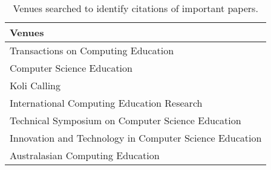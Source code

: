 \begin{table*}[t]
\begin{tabular}{l}
Venues\\\hline
Transactions on Computing Education\\
Computer Science Education\\
Koli Calling\\
International Computing Education Research\\
Technical Symposium on Computer Science Education\\
Innovation and Technology in Computer Science Education\\
Australasian Computing Education\\

\end{tabular}
\caption{Venues searched to identify citations of important papers.}
\end{table*}